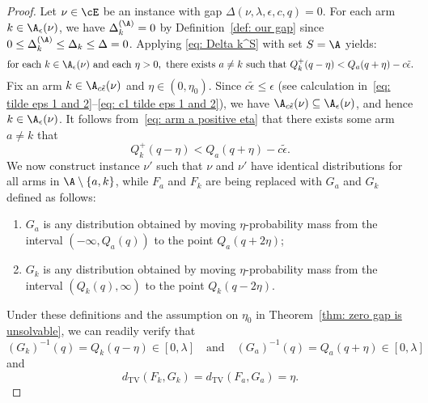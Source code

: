      
 \begin{proof}   
    Let $\nu \in \cE$ be an instance with gap $\Delta(\nu, \lambda, \epsilon, c, q) = 0$. For each arm $k \in \A_{\epsilon}(\nu)$, we have $\Delta_{k}^{(\A)} = 0$ by Definition~\ref{def: our gap} since 
    $0 \le \Delta_{k}^{(\A)}  \le \Delta_{k}  \le \Delta  = 0$.
    Applying \eqref{eq: Delta k^S} with set $S = \A$ yields:
     \begin{equation}
     \label{eq: arm a positive eta}
        \text{for each } k \in \A_{\epsilon}(\nu)
        \text{ and each } \eta > 0, 
        \text{ there exists } a \ne k
        \text{ such that }
         Q^+_{k}(q - \eta) 
        <
        Q_{a}(q + \eta) - c\tilde{\epsilon}.
     \end{equation}
    Fix an arm $k \in \A_{c \tilde{\epsilon}}(\nu)$ and $\eta \in (0, \eta_0)$.
    Since $c \tilde{\epsilon} \le \epsilon$ (see calculation in~\eqref{eq: tilde eps 1 and 2}--\eqref{eq: c1 tilde eps 1 and 2}), we have 
    $\A_{c \tilde{\epsilon}}(\nu) \subseteq \A_{\epsilon}(\nu)$, and hence $k \in \A_{\epsilon}(\nu)$. 
    It follows from~\eqref{eq: arm a positive eta} that there exists some arm $a \ne k$ that
    \begin{equation}
     \label{eq: arm a positive eta c tilde epsilon}
         Q^+_{k}(q - \eta) 
        <
         Q_{a}(q + \eta) - c\tilde{\epsilon}.
     \end{equation}
    We now construct instance $\nu'$ such that $\nu$ and $\nu'$
    have identical distributions for all arms in $\A \setminus \{a, k\}$, 
    while $F_a$ and $F_k$ are being replaced with $G_a$ and $G_k$ defined as follows:
    \begin{enumerate}[topsep=0pt, itemsep=0pt]
        \item 
        $G_a$ is any distribution obtained by moving $\eta$-probability mass from the interval $(-\infty, Q_a(q))$ to the point $Q_a(q+2\eta)$; 
        
        \item 
        $G_k$ is any distribution obtained by moving $\eta$-probability mass from the interval $(Q_k(q), \infty)$ to the point $ Q_k(q-2\eta)$.
    \end{enumerate}     
     Under these definitions and the assumption on $\eta_0$ in Theorem~\ref{thm: zero gap is unsolvable}, we can readily verify that
     \begin{equation}
     \label{eq: shifted q quantiles}
         (G_k)^{-1}(q) =  Q_k(q-\eta) 
         \in [0, \lambda]
         \quad 
         \text{and}
         \quad  
         (G_a)^{-1}(q) = Q_a(q+\eta) \in   [0, \lambda]
     \end{equation}
     and
     \begin{equation}
         d_{\mathrm{TV}}(F_k, G_k) =  d_{\mathrm{TV}}(F_a, G_a) = \eta.
     \end{equation}
    

\end{proof}
